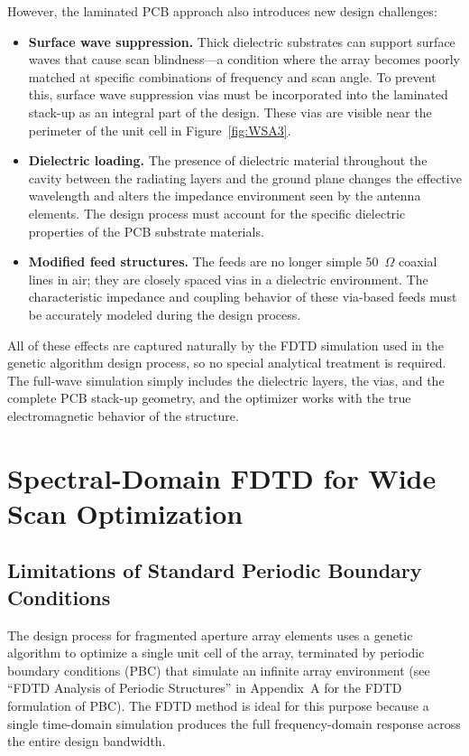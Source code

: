 However, the laminated PCB approach also introduces new design challenges:

\begin{itemize}

\item \textbf{Surface wave suppression.}  Thick dielectric substrates can support surface waves that cause scan blindness---a condition where the array becomes poorly matched at specific combinations of frequency and scan angle.  To prevent this, surface wave suppression vias must be incorporated into the laminated stack-up as an integral part of the design.  These vias are visible near the perimeter of the unit cell in Figure~\ref{fig:WSA3}.

\item \textbf{Dielectric loading.}  The presence of dielectric material throughout the cavity between the radiating layers and the ground plane changes the effective wavelength and alters the impedance environment seen by the antenna elements.  The design process must account for the specific dielectric properties of the PCB substrate materials.

\item \textbf{Modified feed structures.}  The feeds are no longer simple 50~$\Omega$ coaxial lines in air; they are closely spaced vias in a dielectric environment.  The characteristic impedance and coupling behavior of these via-based feeds must be accurately modeled during the design process.

\end{itemize}

All of these effects are captured naturally by the FDTD simulation used in the genetic algorithm design process, so no special analytical treatment is required.  The full-wave simulation simply includes the dielectric layers, the vias, and the complete PCB stack-up geometry, and the optimizer works with the true electromagnetic behavior of the structure.

\section{Spectral-Domain FDTD for Wide Scan Optimization}

\subsection{Limitations of Standard Periodic Boundary Conditions}

The design process for fragmented aperture array elements uses a genetic algorithm to optimize a single unit cell of the array, terminated by periodic boundary conditions (PBC) that simulate an infinite array environment (see ``FDTD Analysis of Periodic Structures'' in Appendix~A for the FDTD formulation of PBC).  The FDTD method is ideal for this purpose because a single time-domain simulation produces the full frequency-domain response across the entire design bandwidth.

